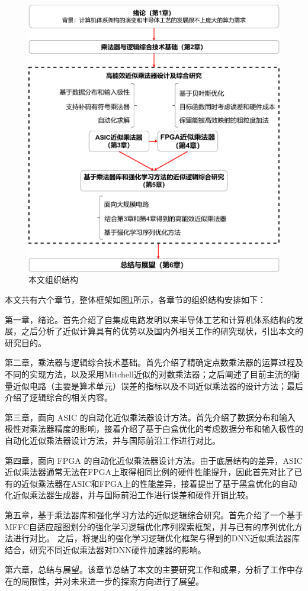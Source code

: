 \begin{figure}[!htb]
    \centering
    \includegraphics[width=\textwidth]{figs/论文结构.pdf}
    \caption{本文组织结构}
    \label{本文组织结构}
\end{figure}

本文共有六个章节，整体框架如图\ref{本文组织结构}所示，各章节的组织结构安排如下：

第一章，绪论。首先介绍了自集成电路发明以来半导体工艺和计算机体系结构的发展，之后分析了近似计算具有的优势以及国内外相关工作的研究现状，引出本文的研究目的。

第二章，乘法器与逻辑综合技术基础。首先介绍了精确定点数乘法器的运算过程及不同的实现方法，以及采用Mitchell近似的对数乘法器\cite{EM:mitchell}；之后阐述了目前主流的衡量近似电路（主要是算术单元）误差的指标以及不同近似乘法器的设计方法；最后介绍了逻辑综合的相关内容。

第三章，面向 ASIC 的自动化近似乘法器设计方法。首先介绍了数据分布和输入极性对乘法器精度的影响，接着介绍了基于白盒优化的考虑数据分布和输入极性的自动化近似乘法器设计方法，并与国际前沿工作进行对比。

第四章，面向 FPGA 的自动化近似乘法器设计方法。由于底层结构的差异，ASIC近似乘法器通常无法在FPGA上取得相同比例的硬件性能提升，因此首先对比了已有的近似乘法器在ASIC和FPGA上的性能差异，接着提出了基于黑盒优化的自动化近似乘法器生成器，并与国际前沿工作进行误差和硬件开销比较。

第五章，基于乘法器库和强化学习方法的近似逻辑综合研究。首先介绍了一个基于MFFC自适应超图划分的强化学习逻辑优化序列探索框架，并与已有的序列优化方法进行对比。
之后，将提出的强化学习逻辑优化框架与得到的DNN近似乘法器库结合，研究不同近似乘法器对DNN硬件加速器的影响。

第六章，总结与展望。该章节总结了本文的主要研究工作和成果，分析了工作中存在的局限性，并对未来进一步的探索方向进行了展望。

